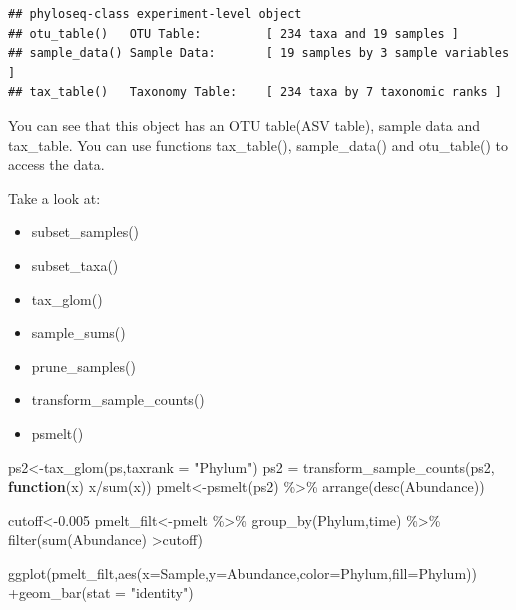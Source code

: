 \documentclass[
]{book}
\newenvironment{Shaded}{\begin{snugshade}}{\end{snugshade}}
\newcommand{\AttributeTok}[1]{\textcolor[rgb]{0.77,0.63,0.00}{#1}}
\newcommand{\ControlFlowTok}[1]{\textcolor[rgb]{0.13,0.29,0.53}{\textbf{#1}}}
\newcommand{\FloatTok}[1]{\textcolor[rgb]{0.00,0.00,0.81}{#1}}
\newcommand{\FunctionTok}[1]{\textcolor[rgb]{0.00,0.00,0.00}{#1}}
\newcommand{\NormalTok}[1]{#1}
\newcommand{\OtherTok}[1]{\textcolor[rgb]{0.56,0.35,0.01}{#1}}
\newcommand{\SpecialCharTok}[1]{\textcolor[rgb]{0.00,0.00,0.00}{#1}}
\newcommand{\StringTok}[1]{\textcolor[rgb]{0.31,0.60,0.02}{#1}}
\providecommand{\tightlist}{%
  \setlength{\itemsep}{0pt}\setlength{\parskip}{0pt}}
\begin{document}
\begin{verbatim}
## phyloseq-class experiment-level object
## otu_table()   OTU Table:         [ 234 taxa and 19 samples ]
## sample_data() Sample Data:       [ 19 samples by 3 sample variables ]
## tax_table()   Taxonomy Table:    [ 234 taxa by 7 taxonomic ranks ]
\end{verbatim}

You can see that this object has an OTU table(ASV table), sample data and tax\_table. You can use functions tax\_table(), sample\_data() and otu\_table() to access the data.

Take a look at:

\begin{itemize}
\tightlist
\item
  subset\_samples()
\item
  subset\_taxa()
\item
  tax\_glom()
\item
  sample\_sums()
\item
  prune\_samples()
\item
  transform\_sample\_counts()
\item
  psmelt()
\end{itemize}

\begin{Shaded}
\begin{Highlighting}[]
\NormalTok{ps2}\OtherTok{\textless{}{-}}\FunctionTok{tax\_glom}\NormalTok{(ps,}\AttributeTok{taxrank =} \StringTok{"Phylum"}\NormalTok{)}
\NormalTok{ps2 }\OtherTok{=} \FunctionTok{transform\_sample\_counts}\NormalTok{(ps2, }\ControlFlowTok{function}\NormalTok{(x) x}\SpecialCharTok{/}\FunctionTok{sum}\NormalTok{(x))}
\NormalTok{pmelt}\OtherTok{\textless{}{-}}\FunctionTok{psmelt}\NormalTok{(ps2) }\SpecialCharTok{\%\textgreater{}\%} \FunctionTok{arrange}\NormalTok{(}\FunctionTok{desc}\NormalTok{(Abundance))}

\NormalTok{cutoff}\OtherTok{\textless{}{-}}\FloatTok{0.005}
\NormalTok{pmelt\_filt}\OtherTok{\textless{}{-}}\NormalTok{pmelt }\SpecialCharTok{\%\textgreater{}\%} \FunctionTok{group\_by}\NormalTok{(Phylum,time) }\SpecialCharTok{\%\textgreater{}\%} \FunctionTok{filter}\NormalTok{(}\FunctionTok{sum}\NormalTok{(Abundance) }\SpecialCharTok{\textgreater{}}\NormalTok{cutoff)}

\FunctionTok{ggplot}\NormalTok{(pmelt\_filt,}\FunctionTok{aes}\NormalTok{(}\AttributeTok{x=}\NormalTok{Sample,}\AttributeTok{y=}\NormalTok{Abundance,}\AttributeTok{color=}\NormalTok{Phylum,}\AttributeTok{fill=}\NormalTok{Phylum)) }\SpecialCharTok{+}\FunctionTok{geom\_bar}\NormalTok{(}\AttributeTok{stat =} \StringTok{"identity"}\NormalTok{)}
\end{Highlighting}
\end{Shaded}
\end{document}
